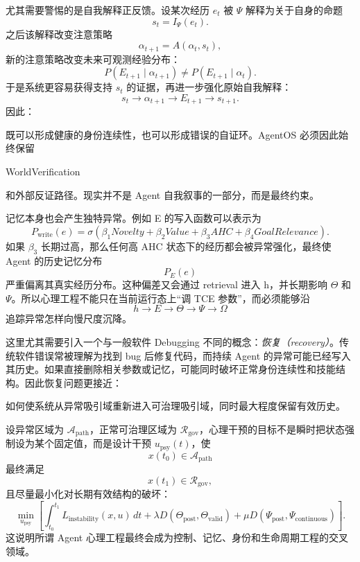 尤其需要警惕的是自我解释正反馈。设某次经历 $e_t$ 被 $\Psi$ 解释为关于自身的命题
\[
s_t
=
I_{\Psi}(e_t).
\]
之后该解释改变注意策略
\[
\alpha_{t+1}
=
A(\alpha_t,s_t),
\]
新的注意策略改变未来可观测经验分布：
\[
P(E_{t+1}\mid \alpha_{t+1})
\neq
P(E_{t+1}\mid \alpha_t).
\]
于是系统更容易获得支持 $s_t$ 的证据，再进一步强化原始自我解释：
\[
s_t
\rightarrow
\alpha_{t+1}
\rightarrow
E_{t+1}
\rightarrow
s_{t+1}.
\]
因此：
\begin{statementbox}
\centering
{}
\end{statementbox}
既可以形成健康的身份连续性，也可以形成错误的自证环。AgentOS 必须因此始终保留
\begin{statementbox}
WorldVerification
\end{statementbox}
和外部反证路径。现实并不是 Agent 自我叙事的一部分，而是最终约束。

记忆本身也会产生独特异常。例如 E 的写入函数可以表示为
\[
P_{\mathrm{write}}(e)
=
\sigma
\left(
\beta_1 Novelty
+
\beta_2 Value
+
\beta_3 AHC
+
\beta_4 GoalRelevance
\right).
\]
如果 $\beta_3$ 长期过高，那么任何高 AHC 状态下的经历都会被异常强化，最终使 Agent 的历史记忆分布
\[
P_E(e)
\]
严重偏离其真实经历分布。这种偏差又会通过 retrieval 进入 h，并长期影响 $\Theta$ 和 $\Psi$。所以心理工程不能只在当前运行态上“调 TCE 参数”，而必须能够沿
\[
h
\rightarrow
E
\rightarrow
\Theta
\rightarrow
\Psi
\rightarrow
\Omega
\]
追踪异常怎样向慢尺度沉降。

这里尤其需要引入一个与一般软件 Debugging 不同的概念：\emph{恢复（recovery）}。传统软件错误常被理解为找到 bug 后修复代码，而持续 Agent 的异常可能已经写入其历史。如果直接删除相关参数或记忆，可能同时破坏正常身份连续性和技能结构。因此恢复问题更接近：
\begin{statementbox}
如何使系统从异常吸引域重新进入可治理吸引域，同时最大程度保留有效历史。
\end{statementbox}
设异常区域为 $\mathcal A_{\mathrm{path}}$，正常可治理区域为 $\mathcal R_{\mathrm{gov}}$，心理干预的目标不是瞬时把状态强制设为某个固定值，而是设计干预 $u_{\mathrm{psy}}(t)$，使
\[
x(t_0)\in\mathcal A_{\mathrm{path}}
\]
最终满足
\[
x(t_1)\in\mathcal R_{\mathrm{gov}},
\]
且尽量最小化对长期有效结构的破坏：
\[
\min_{u_{\mathrm{psy}}}
\left[
\int_{t_0}^{t_1}
L_{\mathrm{instability}}(x,u)\,dt
+
\lambda
D\!\left(
\Theta_{\mathrm{post}},
\Theta_{\mathrm{valid}}
\right)
+
\mu
D\!\left(
\Psi_{\mathrm{post}},
\Psi_{\mathrm{continuous}}
\right)
\right].
\]
这说明所谓 Agent 心理工程最终会成为控制、记忆、身份和生命周期工程的交叉领域。

